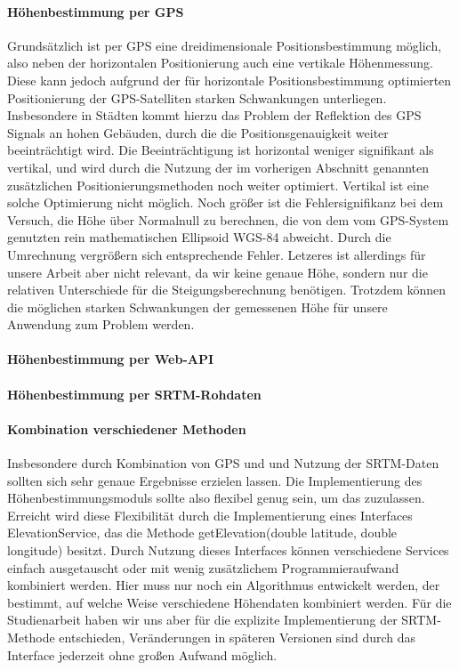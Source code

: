 \paragraph{Höhenbestimmung per GPS}
Grundsätzlich ist per GPS eine dreidimensionale Positionsbestimmung möglich, also neben der horizontalen Positionierung auch eine vertikale Höhenmessung. Diese kann jedoch aufgrund der für horizontale Positionsbestimmung optimierten Positionierung der GPS-Satelliten starken Schwankungen unterliegen. Insbesondere in Städten kommt hierzu das Problem der Reflektion des GPS Signals an hohen Gebäuden, durch die die Positionsgenauigkeit weiter beeinträchtigt wird. Die Beeinträchtigung ist horizontal weniger signifikant als vertikal, und wird durch die Nutzung der im vorherigen Abschnitt genannten zusätzlichen Positionierungsmethoden noch weiter optimiert. Vertikal ist eine solche Optimierung nicht möglich. Noch größer ist die Fehlersignifikanz bei dem Versuch, die Höhe über Normalnull zu berechnen, die von dem vom GPS-System genutzten rein mathematischen Ellipsoid WGS-84 abweicht. Durch die Umrechnung vergrößern sich entsprechende Fehler. \cite{gladstone} Letzeres ist allerdings für unsere Arbeit aber nicht relevant, da wir keine genaue Höhe, sondern nur die relativen Unterschiede für die Steigungsberechnung benötigen. Trotzdem können die möglichen starken Schwankungen der gemessenen Höhe für unsere Anwendung zum Problem werden.
\paragraph{Höhenbestimmung per Web-API}
\paragraph{Höhenbestimmung per SRTM-Rohdaten}
\paragraph{Kombination verschiedener Methoden}
Insbesondere durch Kombination von GPS und und Nutzung der SRTM-Daten sollten sich sehr genaue Ergebnisse erzielen lassen. Die Implementierung des Höhenbestimmungsmoduls sollte also flexibel genug sein, um das zuzulassen. Erreicht wird diese Flexibilität durch die Implementierung eines Interfaces ElevationService, das die Methode getElevation(double latitude, double longitude) besitzt. Durch Nutzung dieses Interfaces können verschiedene Services einfach ausgetauscht oder mit wenig zusätzlichem Programmieraufwand kombiniert werden. Hier muss nur noch ein Algorithmus entwickelt werden, der bestimmt, auf welche Weise verschiedene Höhendaten kombiniert werden. Für die Studienarbeit haben wir uns aber für die explizite Implementierung der SRTM-Methode entschieden, Veränderungen in späteren Versionen sind durch das Interface jederzeit ohne großen Aufwand möglich.
